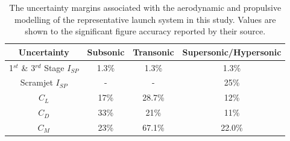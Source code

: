 
\begin{table}[ht]
	\centering
	\begin{tabular}{|c|c|c|c|}
		\hline  Uncertainty & Subsonic & Transonic  & Supersonic/Hypersonic \\ 
		\hline  1$^{st}$ \& 3$^{rd}$ Stage $I_{SP}$ & 1.3\% & 1.3\% &  1.3\% \\ 
		\hline  Scramjet $I_{SP}$ & - & - &  25\% \\ 
		\hline   $C_L$ & 17\% & 28.7\% & 12\% \\  
		\hline   $C_D$ & 33\% & 21\% & 11\% \\  
		\hline   $C_M$  & 23\% & 67.1\% &  22.0\% \\ 
		\hline 
	\end{tabular}
	\caption{The uncertainty margins associated with the aerodynamic and propulsive modelling of the representative launch system in this study. Values are shown to the significant figure accuracy reported by their source.}
	\label{tab:AppendixUncertainty}
\end{table}



